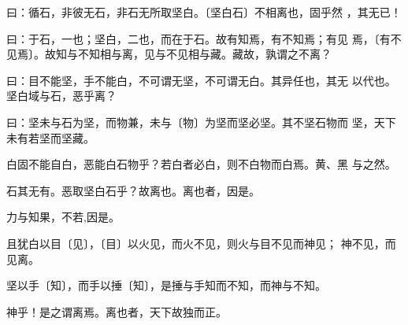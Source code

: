 \documentclass[]{article}
\begin{document}
曰：循石，非彼无石，非石无所取坚白。〔坚白石〕不相离也，固乎然
，其无已！

曰：于石，一也；坚白，二也，而在于石。故有知焉，有不知焉；有见
焉，〔有不见焉〕。故知与不知相与离，见与不见相与藏。藏故，孰谓之不离？

曰：目不能坚，手不能白，不可谓无坚，不可谓无白。其异任也，其无
以代也。坚白域与石，恶乎离？

曰：坚未与石为坚，而物兼，未与〔物〕为坚而坚必坚。其不坚石物而
坚，天下未有若坚而坚藏。

白固不能自白，恶能白石物乎？若白者必白，则不白物而白焉。黄、黑 与之然。

石其无有。恶取坚白石乎？故离也。离也者，因是。

力与知果，不若,因是。

且犹白以目〔见〕，〔目〕以火见，而火不见，则火与目不见而神见；
神不见，而见离。

坚以手〔知〕，而手以捶〔知〕，是捶与手知而不知，而神与不知。

神乎！是之谓离焉。离也者，天下故独而正。
\end{document}
